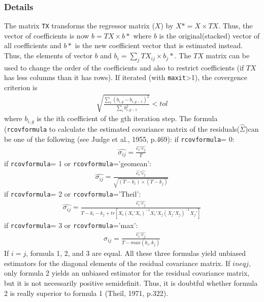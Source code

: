 \subsubsection{Details}
The matrix \texttt{TX} transforms the regressor matrix ($X$) by $X\ast=X \times TX$. Thus,
the vector of coefficients is now $b=TX \times b\ast$ where $b$ is the original(stacked) 
vector of all coefficients and $b\ast$ is the new coefficient vector that is estimated instead.
Thus, the elements of vector $b$ and $b_i = \sum_j TX_{ij}\times b_j\ast$. The $TX$ matrix can be
used to change the order of the coefficients and also to restrict coefficients (if $TX$ has 
less columns than it has rows). 
If iterated (with \texttt{maxit}>1), the covergence criterion is
\begin{eqnarray*}
\sqrt{\frac{\sum_i(b_{i,g}-b_{i,g-1})^2}{\sum_ib_{i,g-1}^2}}< tol
\end{eqnarray*}
where $b_{i,g}$ is the ith coefficient of the gth iteration step.
The formula (\texttt{rcovformula} to calculate the estimated covariance matrix of the residuals($\hat{\Sigma}$)can be one
of the following (see Judge et al., 1955, p.469):
if \texttt{rcovformula}= 0:
\begin{eqnarray*}
\hat{\sigma_{ij}}= \frac{\hat{e_i}\prime\hat{e_j}}{T}
\end{eqnarray*}
if \texttt{rcovformula}= 1 or \texttt{rcovformula}='geomean':
\begin{eqnarray*}
\hat{\sigma_{ij}}= \frac{\hat{e_i}\prime\hat{e_j}}{\sqrt{(T-k_i)\times (T-k_j)}}
\end{eqnarray*}
if \texttt{rcovformula}= 2 or \texttt{rcovformula}='Theil':
\begin{eqnarray*}
\hat{\sigma_{ij}}= \frac{\hat{e_i}\prime\hat{e_j}}{T-k_i-k_j+tr[X_i(X_i\prime X_i)^{-1}X_i\prime X_j(X_j\prime X_j)^{-1}X_j\prime]}
\end{eqnarray*}
if \texttt{rcovformula}= 3 or \texttt{rcovformula}='max':
\begin{eqnarray*}
\hat{\sigma_{ij}}= \frac{\hat{e_i}\prime\hat{e_j}}{T-max(k_i,k_j)}
\end{eqnarray*}
If $i = j$, formula 1, 2, and 3 are equal. All these three formulas yield unbiased estimators
for the diagonal elements of the residual covariance matrix. If $i neq j$, only formula 2
yields an unbiased estimator for the residual covariance matrix, but it is not necessarily
positive semidefinit. Thus, it is doubtful whether formula 2 is really superior to formula 1
(Theil, 1971, p.322).
